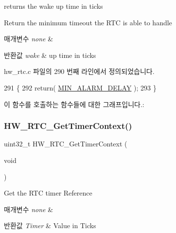 returns the wake up time in ticks 

Return the minimum timeout the R\+TC is able to handle


\begin{DoxyParams}{매개변수}
{\em none} & \\
\hline
\end{DoxyParams}

\begin{DoxyRetVals}{반환값}
{\em wake} & up time in ticks \\
\hline
\end{DoxyRetVals}


hw\+\_\+rtc.\+c 파일의 290 번째 라인에서 정의되었습니다.


\begin{DoxyCode}
291 \{
292   \textcolor{keywordflow}{return}( \mbox{\hyperlink{hw__rtc_8c_a9d5b1559769779b90b2a3de5757e0038}{MIN\_ALARM\_DELAY}} );
293 \}
\end{DoxyCode}
이 함수를 호출하는 함수들에 대한 그래프입니다.\+:
\mbox{\label{group___lory_s_d_k___r_t_c___functions_ga1d964c4efab63ea6a4b4ba8f3773e5b0}} 
\subsubsection{\texorpdfstring{H\+W\+\_\+\+R\+T\+C\+\_\+\+Get\+Timer\+Context()}{HW\_RTC\_GetTimerContext()}}
{\footnotesize\ttfamily uint32\+\_\+t H\+W\+\_\+\+R\+T\+C\+\_\+\+Get\+Timer\+Context (\begin{DoxyParamCaption}\item[{void}]{ }\end{DoxyParamCaption})}



Get the R\+TC timer Reference 


\begin{DoxyParams}{매개변수}
{\em none} & \\
\hline
\end{DoxyParams}

\begin{DoxyRetVals}{반환값}
{\em Timer} & Value in Ticks \\
\hline
\end{DoxyRetVals}


